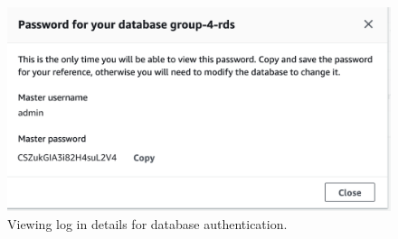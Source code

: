 \begin{figure}[!htbp]
    \centering
    \includegraphics[width=\textwidth]{resources/RDS_password}
    \caption{Viewing log in details for database authentication.}
    \label{fig:view-rds-auth}
\end{figure}
